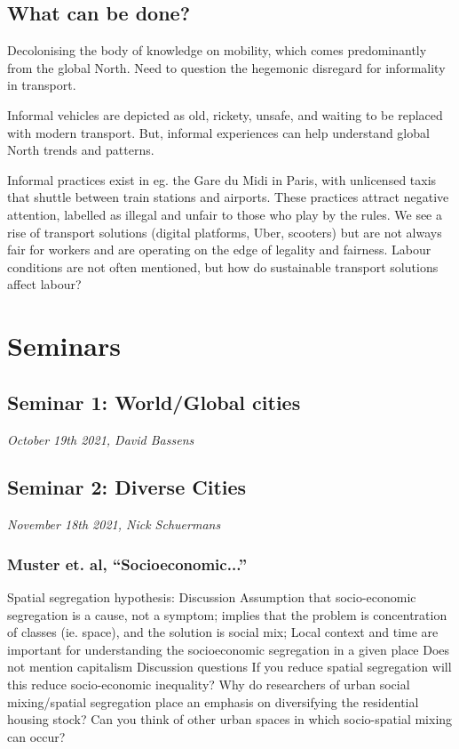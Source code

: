 \documentclass{article}
\begin{document}
\subsection{What can be done?}

Decolonising the body of knowledge on mobility, which comes predominantly from the global North. Need to question the hegemonic disregard for informality in transport. 

Informal vehicles are depicted as old, rickety, unsafe, and waiting to be replaced with modern transport. But, informal experiences can help understand global North trends and patterns.

Informal practices exist in eg. the Gare du Midi in Paris, with unlicensed taxis that shuttle between train stations and airports. These practices attract negative attention, labelled as illegal and unfair to those who play by the rules. We see a rise of transport solutions (digital platforms, Uber, scooters) but are not always fair for workers and are operating on the edge of legality and fairness. Labour conditions are not often mentioned, but how do sustainable transport solutions affect labour?


\section{Seminars}

\subsection{Seminar 1: World/Global cities}
\textit{October 19th 2021, David Bassens}


\subsection{Seminar 2: Diverse Cities}
\textit{November 18th 2021, Nick Schuermans}

\subsubsection{Muster et. al, ``Socioeconomic...''}
\begin{outline}
	\1 Spatial segregation hypothesis:
		\2 
	\1 Discussion
		\2 Assumption that socio-economic segregation is a cause, not a symptom; implies that the problem is concentration of classes (ie. space), and the solution is social mix; 
		\2 Local context and time are important for understanding the socioeconomic segregation in a given place
		\2 Does not mention capitalism
	\1 Discussion questions
		\2 If you reduce spatial segregation will this reduce socio-economic inequality?
		\2 Why do researchers of urban social mixing/spatial segregation place an emphasis on diversifying the residential housing stock? Can you think of other urban spaces in which socio-spatial mixing can occur?
\end{outline}
\end{document}

